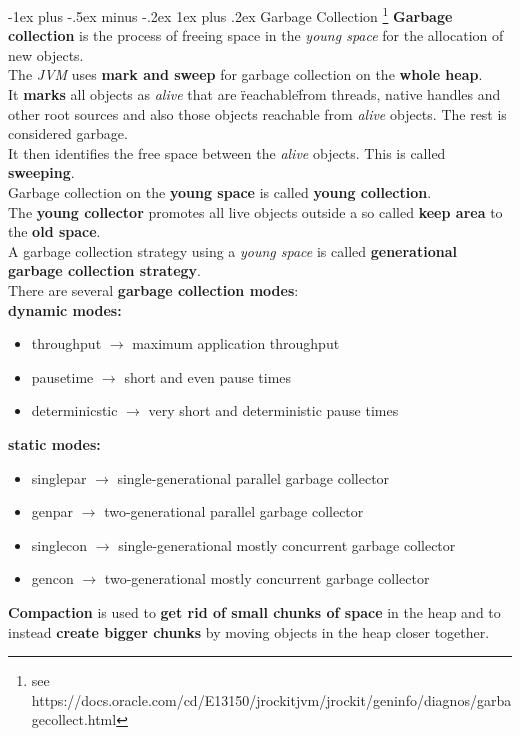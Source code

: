 \documentclass[10pt,landscape]{article}
\makeatletter
\renewcommand{\subsubsection}{\@startsection{subsubsection}{3}{0mm}%
                                {-1ex plus -.5ex minus -.2ex}%
                                {1ex plus .2ex}%
                                {\normalfont\small\bfseries}}
\makeatother
\begin{document}
\begin{multicols}{3}
\subsubsection{Garbage Collection}
\footnote{see https://docs.oracle.com/cd/E13150/jrockit\textunderscore jvm/jrockit/geninfo/diagnos/garbage\textunderscore collect.html}
\textbf{Garbage collection} is the process of freeing space in the \emph{young space} for the allocation of new objects.\\
The \emph{JVM} uses \textbf{mark and sweep} for garbage collection on the \textbf{whole heap}.\\
It \textbf{marks} all objects as \emph{alive} that are \"reachable\" from threads, native handles and other root sources and also those objects reachable from \emph{alive} objects. The rest is considered garbage.\\
It then identifies the free space between the \emph{alive} objects. This is called \textbf{sweeping}.\\
Garbage collection on the \textbf{young space} is called \textbf{young collection}.\\
The \textbf{young collector} promotes all live objects outside a so called \textbf{keep area} to the \textbf{old space}.\\
A garbage collection strategy using a \emph{young space} is called \textbf{generational garbage collection strategy}.\\
There are several \textbf{garbage collection modes}:\\
\textbf{dynamic modes:}
\begin{itemize}
\item throughput $\rightarrow$ maximum application throughput
\item pausetime $\rightarrow$ short and even pause times
\item determinicstic $\rightarrow$ very short and deterministic pause times
\end{itemize}
\textbf{static modes:}
\begin{itemize}
\item singlepar $\rightarrow$ single-generational parallel garbage collector
\item genpar $\rightarrow$ two-generational parallel garbage collector
\item singlecon $\rightarrow$ single-generational mostly concurrent garbage collector
\item gencon $\rightarrow$ two-generational mostly concurrent garbage collector
\end{itemize}
\textbf{Compaction} is used to \textbf{get rid of small chunks of space} in the heap and to instead \textbf{create bigger chunks} by moving objects in the heap closer together.


\end{multicols}
\end{document}
